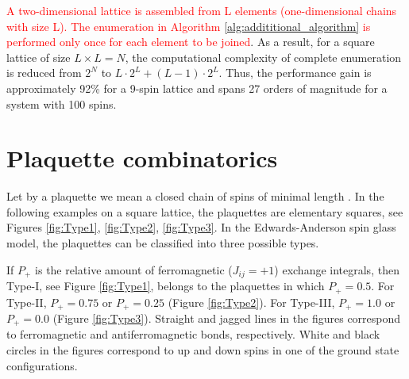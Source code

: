 \documentclass[preprint,12pt]{elsarticle}
\begin{document}
\textcolor{red}{A two-dimensional lattice is assembled from L elements (one-dimensional chains with size L). The enumeration in Algorithm \ref{alg:addititional_algorithm} is performed only once for each element to be joined}. As a result, for a square lattice of size $L \times L = N$, the computational complexity of complete enumeration is reduced from $2^{N}$ to $L \cdot 2^L + (L - 1) \cdot 2^L$. Thus, the performance gain is approximately 92\% for a 9-spin lattice and spans 27 orders of magnitude for a system with 100 spins.

\section{Plaquette combinatorics}

Let by a plaquette we mean a closed chain of spins of minimal length \cite{lebrecht2015j}. In the following examples on a square lattice, the plaquettes are elementary squares, see Figures \ref{fig:Type1}, \ref{fig:Type2}, \ref{fig:Type3}. In the Edwards-Anderson spin glass model, the plaquettes can be classified into three possible types. 

If $P_+$ is the relative amount of ferromagnetic ($J_{ij}=+1$) exchange integrals, then Type-I, see Figure \ref{fig:Type1}, belongs to the plaquettes in which $P_+=0.5$. For Type-II, $P_+=0.75$ or $P_+=0.25$ (Figure \ref{fig:Type2}). For Type-III, $P_+=1.0$ or $P_+=0.0$ (Figure \ref{fig:Type3}). Straight and jagged lines in the figures correspond to ferromagnetic and antiferromagnetic bonds, respectively. White and black circles in the figures correspond to up and down spins in one of the ground state configurations.
\end{document}
